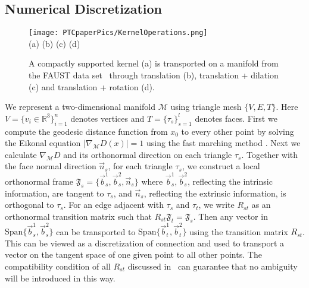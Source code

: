 \documentclass[10pt,twocolumn,letterpaper]{article}
\def\M{\mathcal{M}}
\def\RR{\mathbb{R}}
\def\vb{\vec{b}}
\def\vn{\vec{n}}
\begin{document}
\subsection{Numerical Discretization}
\begin{figure}
 \centering
\texttt{[image: PTCpaperPics/KernelOperations.png]}\\{\centering (a)\hspace{1.7cm} (b) \hspace{1.7cm} (c) \hspace{1.7cm} (d)}
\caption{A compactly supported kernel (a) is transported on a manifold from the FAUST data set~\cite{bogo2014faust} through translation (b), translation + dilation (c) and translation + rotation (d).}
  \label{fig:ConvKernel}
\end{figure} 
%
We represent a two-dimensional manifold $\M$ using triangle mesh $\{V, E, T\}$. Here $V = \{v_i \in \RR^3\}_{i=1}^n$ denotes vertices and $T = \{\tau_s \}_{s=1}^l$ denotes faces. First we compute the geodesic distance function from $x_0$ to every other point by solving the Eikonal equation $|\nabla_\M D(x) | = 1$ using the fast marching method \cite{sethian1996fast,kimmel1998computing}. Next we calculate $\nabla_\M D$ and its orthonormal direction on each triangle $\tau_s$. Together with the face normal direction $\vn_{s}$,
for each triangle $\tau_s$, we construct a local orthonormal frame $\mathfrak{F}_s = \{\vb_{s}^1,\vb_{s}^2,\vn_{s}\}$ where $\vb_{s}^1,\vb_{s}^2$, reflecting the intrinsic information, are tangent to $\tau_s$,  and $\vn_{s}$, reflecting the extrinsic information, is orthogonal to $\tau_s$. For an edge adjacent with $\tau_s$ and $\tau_t$, we write $R_{st}$ as an orthonormal transition matrix such that $R_{st}\mathfrak{F}_t = \mathfrak{F}_s$. Then any vector in $\mathrm{Span}\{\vb_{s}^1,\vb_{s}^2\}$ can be transported to $\mathrm{Span}\{\vb_{t}^1,\vb_{t}^2\}$ using the transition matrix $R_{st}$. This can be viewed as a discretization of connection and used to transport a vector on the tangent space of one given point to all other points.
The compatibility condition of all $R_{st}$ discussed in~\cite{wang2012linear} can guarantee  that no ambiguity will be introduced in this way.

\end{document}
